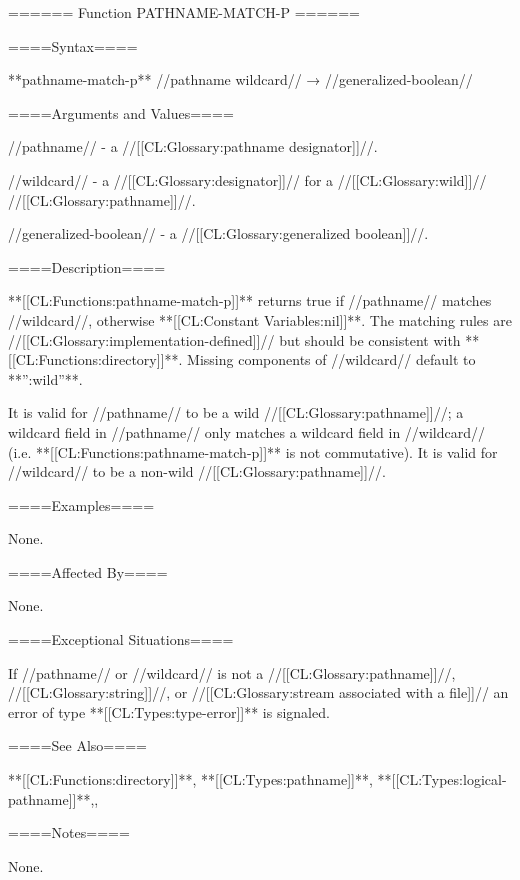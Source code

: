 ====== Function PATHNAME-MATCH-P ======

====Syntax====

**pathname-match-p** //pathname wildcard// → //generalized-boolean//

====Arguments and Values====

//pathname// - a //[[CL:Glossary:pathname designator]]//.

//wildcard// - a //[[CL:Glossary:designator]]// for a //[[CL:Glossary:wild]]// //[[CL:Glossary:pathname]]//.

//generalized-boolean// - a //[[CL:Glossary:generalized boolean]]//.

====Description====

**[[CL:Functions:pathname-match-p]]** returns true if //pathname// matches //wildcard//, otherwise **[[CL:Constant Variables:nil]]**. The matching rules are //[[CL:Glossary:implementation-defined]]// but should be consistent with **[[CL:Functions:directory]]**. Missing components of //wildcard// default to **'':wild''**.

It is valid for //pathname// to be a wild //[[CL:Glossary:pathname]]//; a wildcard field in //pathname// only matches a wildcard field in //wildcard// (i.e. **[[CL:Functions:pathname-match-p]]** is not commutative). It is valid for //wildcard// to be a non-wild //[[CL:Glossary:pathname]]//.

====Examples====

None.

====Affected By====

None.

====Exceptional Situations====

If //pathname// or //wildcard// is not a //[[CL:Glossary:pathname]]//, //[[CL:Glossary:string]]//, or //[[CL:Glossary:stream associated with a file]]// an error of type **[[CL:Types:type-error]]** is signaled.

====See Also====

**[[CL:Functions:directory]]**, **[[CL:Types:pathname]]**, **[[CL:Types:logical-pathname]]**,{\secref\FileSystemConcepts},

{\secref\PathnamesAsFilenames}

====Notes====

None.

   
